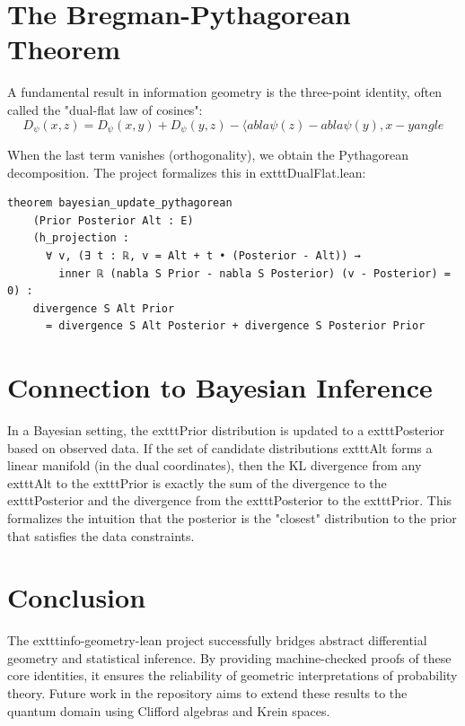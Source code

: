 \documentclass[11pt,a4paper]{article}
\begin{document}
\section{The Bregman-Pythagorean Theorem}
A fundamental result in information geometry is the three-point identity, often called the "dual-flat law of cosines":
\[ D_\psi(x, z) = D_\psi(x, y) + D_\psi(y, z) - \langle 
abla \psi(z) - 
abla \psi(y), x - y 
angle \]

When the last term vanishes (orthogonality), we obtain the Pythagorean decomposition. The project formalizes this in 	exttt{DualFlat.lean}:

\begin{lstlisting}
theorem bayesian_update_pythagorean
    (Prior Posterior Alt : E)
    (h_projection : 
      ∀ v, (∃ t : ℝ, v = Alt + t • (Posterior - Alt)) →
        inner ℝ (nabla S Prior - nabla S Posterior) (v - Posterior) = 0) :
    divergence S Alt Prior
      = divergence S Alt Posterior + divergence S Posterior Prior
\end{lstlisting}

\section{Connection to Bayesian Inference}
In a Bayesian setting, the 	exttt{Prior} distribution is updated to a 	exttt{Posterior} based on observed data. If the set of candidate distributions 	exttt{Alt} forms a linear manifold (in the dual coordinates), then the KL divergence from any 	exttt{Alt} to the 	exttt{Prior} is exactly the sum of the divergence to the 	exttt{Posterior} and the divergence from the 	exttt{Posterior} to the 	exttt{Prior}. This formalizes the intuition that the posterior is the "closest" distribution to the prior that satisfies the data constraints.

\section{Conclusion}
The 	exttt{info-geometry-lean} project successfully bridges abstract differential geometry and statistical inference. By providing machine-checked proofs of these core identities, it ensures the reliability of geometric interpretations of probability theory. Future work in the repository aims to extend these results to the quantum domain using Clifford algebras and Krein spaces.
\end{document}

